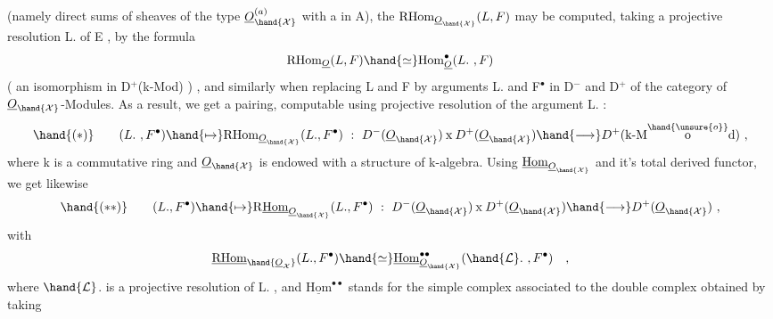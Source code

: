 (namely direct sums of sheaves of the type $\underline{O}_{\hand{\mathcal{X}}}^{(a)}$ with a in A), the
$\mathrm{RHom}_{\underline{O}_{\hand{\mathcal{X}}}}(L,F)$ may be computed, taking a projective resolution L. of E ,
by the formula
\[ \mathrm{RHom}_{\underline{O}}(L,F) \hand{\simeq} \mathrm{Hom}^{\bullet}_{\underline{O}}(L. \ , F) \]
( an isomorphism in D$^{+}$(k-Mod)  ) , and similarly when replacing L and
F by arguments L. and F$^{\bullet}$ in D$^{-}$ and D$^{+}$ of the category of $\underline{O}_{\hand{\mathcal{X}}}$-Modules.
As a result, we get a pairing, computable  using projective resolution
of the argument L. :
\[ \hand{(*)} \qquad (L. \ , F^{\bullet}) \hand{\mapsto} \mathrm{RHom}_{\underline{O}_{\hand{\mathcal{X}}}}(L.,F^{\bullet}) \ : \ D^{-}(\underline{O}_{\hand{\mathcal{X}}}) \mathbin{\mathrm{x}} D^{+}(\underline{O}_{\hand{\mathcal{X}}}) \hand{\longrightarrow} D^{+}(\text{k-M}\overset{\hand{\unsure{o}}}{\text{o}}\text{d}) \ , \]
where k is a commutative ring and $\underline{O}_{\hand{\mathcal{X}}}$ is endowed with a structure of
k-algebra. Using $\underline{\mathrm{Hom}}_{\underline{O}_{\hand{\mathcal{X}}}}$ and it's total derived functor, we get likewise
\[ \hand{(**)} \qquad (L.,F^{\bullet}) \hand{\mapsto} \mathrm{R}\underline{\mathrm{Hom}}_{\underline{O}_{\hand{\mathcal{X}}}}(L.,F^{\bullet}) \ : \ D^{-}(\underline{O}_{\hand{\mathcal{X}}}) \mathbin{\mathrm{x}} D^{+}(\underline{O}_{\hand{\mathcal{X}}}) \hand{\longrightarrow} D^{+}(\underline{O}_{\hand{\mathcal{X}}}) \ , \]
with
\[ \underline{\mathrm{RHom}}_{\hand{\underline{O}_{\mathcal{X}}}}(L.,F^{\bullet}) \hand{\simeq} \underline{\mathrm{Hom}}_{\underline{O}_{\hand{\mathcal{X}}}}^{\bullet\bullet}(\hand{\mathcal{L}}. \ , F^{\bullet}) \quad , \]
where $\hand{\mathcal{L}}$. is a projective resolution of L. , and $\underline{\mathrm{Hom}}^{\bullet\bullet}$ stands for
the simple complex associated to the double complex obtained by taking

